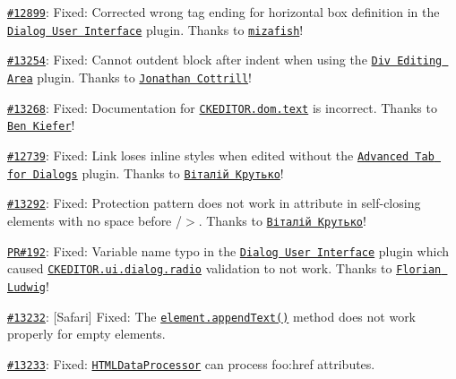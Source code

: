 \begin{DoxyItemize}
\item \href{http://dev.ckeditor.com/ticket/12899}{\tt \#12899}\+: Fixed\+: Corrected wrong tag ending for horizontal box definition in the \href{http://ckeditor.com/addon/dialogui}{\tt Dialog User Interface} plugin. Thanks to \href{https://github.com/mizafish}{\tt mizafish}!
\item \href{http://dev.ckeditor.com/ticket/13254}{\tt \#13254}\+: Fixed\+: Cannot outdent block after indent when using the \href{http://ckeditor.com/addon/divarea}{\tt Div Editing Area} plugin. Thanks to \href{https://github.com/jcttrll}{\tt Jonathan Cottrill}!
\item \href{http://dev.ckeditor.com/ticket/13268}{\tt \#13268}\+: Fixed\+: Documentation for \href{http://docs.ckeditor.com/#!/api/CKEDITOR.dom.text}{\tt {\ttfamily C\+K\+E\+D\+I\+T\+O\+R.\+dom.\+text}} is incorrect. Thanks to \href{https://github.com/benkiefer}{\tt Ben Kiefer}!
\item \href{http://dev.ckeditor.com/ticket/12739}{\tt \#12739}\+: Fixed\+: Link loses inline styles when edited without the \href{http://ckeditor.com/addon/dialogadvtab}{\tt Advanced Tab for Dialogs} plugin. Thanks to \href{https://github.com/asmforce}{\tt Віталій Крутько}!
\item \href{http://dev.ckeditor.com/ticket/13292}{\tt \#13292}\+: Fixed\+: Protection pattern does not work in attribute in self-\/closing elements with no space before {\ttfamily /$>$}. Thanks to \href{https://github.com/asmforce}{\tt Віталій Крутько}!
\item \href{https://github.com/ckeditor/ckeditor-dev/pull/192}{\tt PR\#192}\+: Fixed\+: Variable name typo in the \href{http://ckeditor.com/addon/dialogui}{\tt Dialog User Interface} plugin which caused \href{http://docs.ckeditor.com/#!/api/CKEDITOR.ui.dialog.radio}{\tt {\ttfamily C\+K\+E\+D\+I\+T\+O\+R.\+ui.\+dialog.\+radio}} validation to not work. Thanks to \href{https://github.com/FlorianLudwig}{\tt Florian Ludwig}!
\item \href{http://dev.ckeditor.com/ticket/13232}{\tt \#13232}\+: \mbox{[}Safari\mbox{]} Fixed\+: The \href{http://docs.ckeditor.com/#!/api/CKEDITOR.dom.element-method-appendText}{\tt {\ttfamily element.\+append\+Text()}} method does not work properly for empty elements.
\item \href{http://dev.ckeditor.com/ticket/13233}{\tt \#13233}\+: Fixed\+: \href{http://docs.ckeditor.com/#!/api/CKEDITOR.htmlDataProcessor}{\tt H\+T\+M\+L\+Data\+Processor} can process {\ttfamily foo\+:href} attributes.

\end{DoxyItemize}
